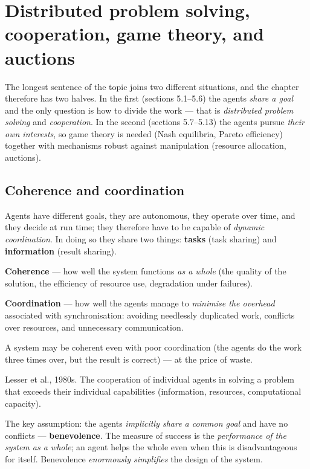 \documentclass[11pt,a4paper]{article}
\theoremstyle{definition}
\begin{document}
\section{Distributed problem solving, cooperation, game theory, and auctions}
\label{sec:kooperace}

The longest sentence of the topic joins two different situations, and the chapter therefore has
two halves. In the first (sections 5.1--5.6) the agents \emph{share a goal} and the only question
is how to divide the work --- that is \emph{distributed problem solving} and \emph{cooperation}.
In the second (sections 5.7--5.13) the agents pursue \emph{their own interests}, so game theory
is needed (Nash equilibria, Pareto efficiency) together with mechanisms robust against
manipulation (resource allocation, auctions).
\subsection{Coherence and coordination}

Agents have different goals, they are autonomous, they operate over time, and they decide at run
time; they therefore have to be capable of \emph{dynamic coordination}. In doing so they share two
things: \textbf{tasks} (task sharing) and \textbf{information} (result sharing).

\begin{defbox}
\textbf{Coherence} --- how well the system functions \emph{as a whole}
(the quality of the solution, the efficiency of resource use, degradation under failures).

\textbf{Coordination} --- how well the agents manage to \emph{minimise the overhead}
associated with synchronisation: avoiding needlessly duplicated work, conflicts over resources, and
unnecessary communication.

A system may be coherent even with poor coordination (the agents do the work three times over, but the
result is correct) --- at the price of waste.
\end{defbox}

\begin{defbox}
Lesser et al., 1980s. The cooperation of individual agents in solving a problem that exceeds their
individual capabilities (information, resources, computational capacity).

The key assumption: the agents \emph{implicitly share a common goal} and have no conflicts ---
\textbf{benevolence}. The measure of success is the \emph{performance of the system as a whole}; an
agent helps the whole even when this is disadvantageous for itself. Benevolence \emph{enormously
simplifies} the design of the system.
\end{defbox}
\end{document}
